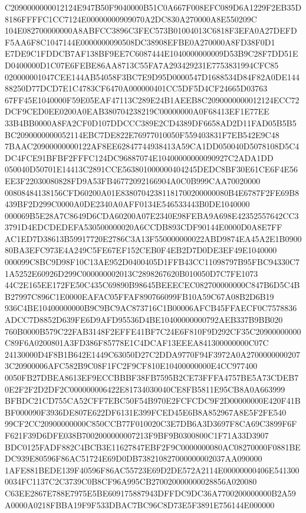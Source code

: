 \documentclass[UTF8,fontset=fandol,zihao=-4,a4paper]{ctexart}
\begin{document}
{{C2090000000012124E947B50F9040000B51C0A667F008EFC089D6A1229F2EB35D8186FFFFC1CC7124E00000000909070A2DC830A270000A8E550209C
104E082700000000A8ABFCC3896C3FEC573B01004013C6818F3EFA0A27DEFDF5AA6F8C1047144E0000000090508DC38908EFBE0A270000A8FD38F0D1
E7DE9C1FDDCB7AF138BF9EE7C6087444E1040000000009D53B9C28F7DD51ED0400000D1C07E6FEBE86AA8713C55FA7A293429231E7753831994CFC85
020000001047CEE144AB54058F3BC7E9D95D0000547D1688534D84F82A0DE14488250D77DCD7E1C4783CF6470A000000401CC5DF5D4CF24665D03763
67FF45E1040000F59E05EAF47113C289E24B1AEEB8C2090000000012124ECC72DCF9CED0EE0200A0EAB380704238219C00000000A0F68413EF1E77EE
33B4BB0000A8FA2CF0D107DDCCC389E2CD4389DF6658AD2D11FAD05B5B5BC2090000000052114EBC7DE822E76977010050F559403831F7EB542E9C48
7BAAC20900000000122AF8EE62847744938413A59CA1DD050040D5078108D5C4DC4FCE91BFBF2FFFC124DC96887074E10400000000090927C2ADA1DD
050040D50701E14413C2891CCE563801000000404245DEDC8BF30E61CE6F4E56EE3F22030080828FD9A53FB46772092166904A0C0B999CAA70020000
00808484138156CFD60200A01E83807042381181700200000080B4E6787F2FE69B8439BF2D299C0000A0DE2340A0AFF0134E546533443B0DE1040000
000069B5E28A7C8649D6CDA60200A07E2340E98FEBA9A698E42352557642CC33791D4EDCDEDEFA530500000020A6CCDB893CDF90144E0000D0A8E7FF
AC1ED7D38613B59917720E2786C3A13F550000000022ABD9874EA45A2E1B090080BA3EFC973E4A249C5FE67EF152CEB0F4EB2D7D0DE3EF49E1040000
000099C8BC9D98F10C13AE952D0400405D1FFB43CC11098797B95FBC94330C71A5252E60926D299C000000002013C2898267620B010050D7C7FE1073
44C2E165EE172FE50C435C69890B98645BEEECEC082700000000C847B6D5C4BB27997C896C1E0000EAFAC05FFAF890766099FB10A59C67A08B2D6B19
936C4BE10400000000B9C9BC9AC873716C1B00006AFCB45FFAECF0C7578836ADCC7D8852D639FE6D9AFD95536D4BE10400000000792AEB337B9BB020
760B0000B579C22FAB3148F2EFFE41BF7C24E6F810F9D292CF35C20900000000C89F6A0200801A3FD386F85778E1C4DCAF13EEEA841300000000C07C
24130000D4F8B1B642E1449C63050D27C2DDA9770F94F3972A0A27000000002073C20900006AFC582B9C08F1FC2F9CF810E10400000000E4CC977400
0050FB27DBEA8613EF9ECCBBBF38FB7595B2CE73FFFA4757BE5A73CDEB70E2F2F2D2DF2C000000006422E81734030040CE8FB5811E95CB8A0A663999
BFBDC21CD755CA52CFF7EBC50F54B970E2FCFCDC9F2D00000000E420F41BBF000090F3936DE807E622DF6131E399FCED45E6B8A852967A8E5F2FE540
99CF2CC20900000000C850CCB77F010020C3E7DB6A3D3697F8CA69C3899F6FF621F39D6DFE038B7002000000007213F9BF9B0300800C1F71A33D3907
BDC0125FADF882C4BCB3E11627847EBF2F9C0000000080AC08270000F0881BEDC939E80596F86AC51724E69D0DB738210827000000002037AA090000
1AFE881BEDE139F40596F86AC55723E69D2DE572A2114E00000000406E5413000034FC1137C2C3739C0B8CF96A995CB270020000000028856A020080
C63EE2867E788E7975E5BE609175887943DFFDC9DC36A7700200000000B2A59A0000A0218FBBA19F9F533DBAC7BC96C8D73E5F3891E756144E000000
}}
\end{document}
